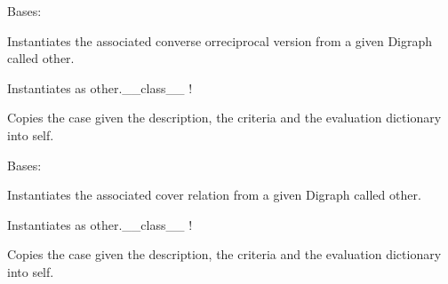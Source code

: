 \documentclass[letterpaper,10pt,english]{sphinxmanual}
\begin{document}

\begin{fulllineitems}
\label{techDoc:digraphs.ConverseDigraph}
Bases: {\hyperref[techDoc:digraphs.Digraph]{}}

Instantiates the associated converse orreciprocal version from
a given Digraph called other.

Instantiates as other.\_\_class\_\_ !

Copies the case given the description, the criteria
and the evaluation dictionary into self.

\end{fulllineitems}


\begin{fulllineitems}
\label{techDoc:digraphs.CoverDigraph}
Bases: {\hyperref[techDoc:digraphs.Digraph]{}}

Instantiates the associated cover relation from
a given Digraph called other.

Instantiates as other.\_\_class\_\_ !

Copies the case given the description, the criteria
and the evaluation dictionary into self.

\end{fulllineitems}

\end{document}
